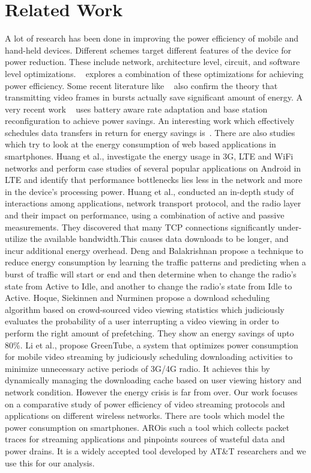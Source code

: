 \section{Related Work}
A lot of research has been done in improving the power efficiency of mobile and hand-held devices. Different schemes target different features of the device for power reduction. These include network, architecture level, circuit, and software level optimizations. ~\cite{mohapatra_mm03} explores a combination of these optimizations for achieving power efficiency. Some recent literature like ~\cite{mobiarch,movid} also confirm the theory that transmitting video frames in bursts actually save significant amount of energy. A very recent work ~\cite{ucsd_wcnc} uses battery aware rate adaptation and base station reconfiguration to achieve power savings. An interesting work which effectively schedules data transfers in return for energy savings is~\cite{balasubramanian_imc09}. There are also studies which try to look at the energy consumption of web based applications in smartphones. Huang et al.,\cite{huang2012close} investigate the energy usage in 3G, LTE and WiFi networks and perform case studies of several popular applications on Android in LTE and identify that performance bottlenecks lies less in the network and more in the device's processing power.
Huang et al.,\cite{huang2013depth} conducted an in-depth study of interactions among applications, network transport protocol, and the radio layer and their impact on performance, using a combination of active and passive measurements. They discovered that many TCP connections significantly under-utilize the available bandwidth.This causes data downloads to be longer, and incur additional energy overhead.  
Deng and Balakrishnan\cite{deng2012traffic} propose a technique to reduce energy consumption by learning the traffic patterns and predicting when a burst of traffic will start or end and then determine when to change the radio's state from Active to Idle, and another to change the radio's state from Idle to Active.
Hoque, Siekinnen and Nurminen\cite{hoque2013using} propose a download scheduling algorithm based on crowd-sourced video viewing statistics which judiciously evaluates the probability of a user interrupting a video viewing in order to perform the right amount of prefetching. They show an energy savings of upto 80\%.
Li et al.,\cite{li2012greentube} propose GreenTube, a system that optimizes power consumption for mobile video streaming by judiciously scheduling downloading activities to minimize unnecessary active periods of 3G/4G radio. It achieves this by dynamically managing the downloading cache based on user viewing history and network condition. 
However the energy crisis is far from over. Our work focuses on a comparative study of power efficiency of video streaming protocols and applications on different wireless networks.
There are tools which model the power consumption on smartphones. ARO\cite{qian2011demo}is such a tool which collects packet traces for streaming applications and pinpoints sources of wasteful data and power drains. It is a widely accepted tool developed by AT\&T researchers and we use this for our analysis.

